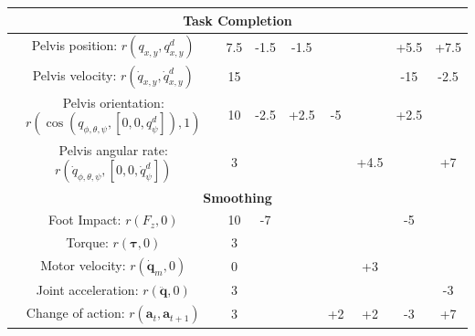 \begin{table}[!htp]
\begin{tabular}{|cccccccc|}
\multicolumn{8}{|c|}{\textbf{Task Completion}} \\ \hline
\multicolumn{1}{|c|}{Pelvis position: $r(q_{x,y}, q^d_{x,y})$} &
  \multicolumn{1}{c|}{7.5} &
  \multicolumn{1}{c|}{-1.5} &
  \multicolumn{1}{c|}{-1.5} &
  \multicolumn{1}{c|}{} &
  \multicolumn{1}{c|}{} &
  \multicolumn{1}{c|}{+5.5} &
  +7.5 \\ \hline
\multicolumn{1}{|c|}{Pelvis velocity: $r(\dot{q}_{x,y}, \dot{q}^d_{x,y})$} &
  \multicolumn{1}{c|}{15} &
  \multicolumn{1}{c|}{} &
  \multicolumn{1}{c|}{} &
  \multicolumn{1}{c|}{} &
  \multicolumn{1}{c|}{} &
  \multicolumn{1}{c|}{-15} &
  -2.5 \\ \hline
\multicolumn{1}{|c|}{Pelvis orientation: $r(\cos(q_{\phi,\theta,\psi}, [0,0,q^d_\psi]), 1)$} &
  \multicolumn{1}{c|}{10} &
  \multicolumn{1}{c|}{-2.5} &
  \multicolumn{1}{c|}{+2.5} &
  \multicolumn{1}{c|}{-5} &
  \multicolumn{1}{c|}{} &
  \multicolumn{1}{c|}{+2.5} &
  {} \\ \hline
\multicolumn{1}{|c|}{Pelvis angular rate: $r(\dot{q}_{\phi,\theta,\psi}, [0,0,\dot{q}^d_\psi])$} &
  \multicolumn{1}{c|}{3} &
  \multicolumn{1}{c|}{} &
  \multicolumn{1}{c|}{} &
  \multicolumn{1}{c|}{} &
  \multicolumn{1}{c|}{+4.5} &
  \multicolumn{1}{c|}{} &
  +7 \\ \hline
\multicolumn{8}{|c|}{\textbf{Smoothing}} \\ \hline
\multicolumn{1}{|c|}{Foot Impact: $r(F_z, 0)$} &
  \multicolumn{1}{c|}{10} &
  \multicolumn{1}{c|}{-7} &
  \multicolumn{1}{c|}{} &
  \multicolumn{1}{c|}{} &
  \multicolumn{1}{c|}{} &
  \multicolumn{1}{c|}{-5} &
  {} \\ \hline
\multicolumn{1}{|c|}{Torque: $r(\bm{\tau}, 0)$} &
  \multicolumn{1}{c|}{3} &
  \multicolumn{1}{c|}{} &
  \multicolumn{1}{c|}{} &
  \multicolumn{1}{c|}{} &
  \multicolumn{1}{c|}{} &
  \multicolumn{1}{c|}{} &
  {} \\ \hline
\multicolumn{1}{|c|}{Motor velocity: $r(\dot{\mathbf{q}}_m, 0)$} &
  \multicolumn{1}{c|}{0} &
  \multicolumn{1}{c|}{} &
  \multicolumn{1}{c|}{} &
  \multicolumn{1}{c|}{} &
  \multicolumn{1}{c|}{+3} &
  \multicolumn{1}{c|}{} &
  {} \\ \hline
\multicolumn{1}{|c|}{Joint acceleration: $r(\ddot{\mathbf{q}}, 0)$} &
  \multicolumn{1}{c|}{3} &
  \multicolumn{1}{c|}{} &
  \multicolumn{1}{c|}{} &
  \multicolumn{1}{c|}{} &
  \multicolumn{1}{c|}{} &
  \multicolumn{1}{c|}{} &
  -3 \\ \hline
\multicolumn{1}{|c|}{Change of action: $r(\mathbf{a}_t, \mathbf{a}_{t+1})$} &
  \multicolumn{1}{c|}{3} &
  \multicolumn{1}{c|}{} &
  \multicolumn{1}{c|}{} &
  \multicolumn{1}{c|}{+2} &
  \multicolumn{1}{c|}{+2} &
  \multicolumn{1}{c|}{-3} &
  +7 \\ \hline
\end{tabular}
\end{table}
